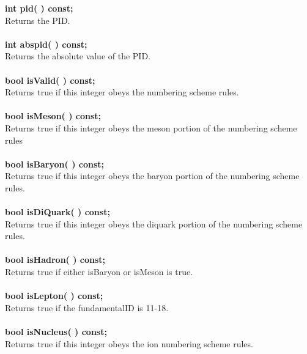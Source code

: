 \documentclass[twoside,12pt]{article}
\begin{document}
\begin{tabbing}
\hspace{0.5in}  {\bf int    pid( )        const; } \\
\hspace{0.5in}  Returns the PID. \\ \\
\hspace{0.5in}  {\bf int abspid( )        const; } \\
\hspace{0.5in}  Returns the absolute value of the PID. \\ \\

\hspace{0.5in}  {\bf bool isValid( )   const; }\\
\hspace{0.5in}  Returns true if this integer obeys the numbering scheme rules. \\ \\
\hspace{0.5in}  {\bf bool isMeson( )   const; }\\
\hspace{0.5in}  Returns true if this integer obeys the meson  portion of the numbering scheme rules\\ \\
\hspace{0.5in}  {\bf bool isBaryon( )  const; }\\
\hspace{0.5in}  Returns true if this integer obeys the baryon portion of the numbering scheme rules.\\ \\
\hspace{0.5in}  {\bf bool isDiQuark( ) const; }\\
\hspace{0.5in}  Returns true if this integer obeys the diquark portion of the numbering scheme rules.\\ \\
\hspace{0.5in}  {\bf bool isHadron( )  const; }\\
\hspace{0.5in}  Returns true if either isBaryon or isMeson is true. \\ \\
\hspace{0.5in}  {\bf bool isLepton( )  const; }\\
\hspace{0.5in}  Returns true if the fundamentalID is 11-18. \\ \\
\hspace{0.5in}  {\bf bool isNucleus( )  const; }\\
\hspace{0.5in}  Returns true if this integer obeys the ion numbering scheme rules. \\ \\


\end{tabbing}
\end{document}
